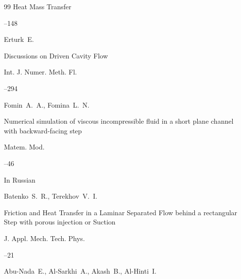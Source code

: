 \begin{thebibliography}{99}
\jour Heat Mass Transfer




--148





\by Erturk~E.

\paper Discussions on Driven Cavity Flow

\jour Int. J. Numer. Meth. Fl.




--294





\by Fomin~A.~A., Fomina~L.~N.

\paper Numerical simulation of viscous incompressible fluid in a short plane channel with backward-facing step

\jour Matem. Mod.




--46



\lang In Russian




\by Batenko~S.~R., Terekhov~V.~I.

\paper Friction and Heat Transfer in a Laminar Separated Flow behind a rectangular Step with porous injection or Suction

\jour J. Appl. Mech. Tech. Phys.




--21





\by Abu-Nada~E., Al-Sarkhi~A., Akash~B., Al-Hinti~I.


\end{thebibliography}
